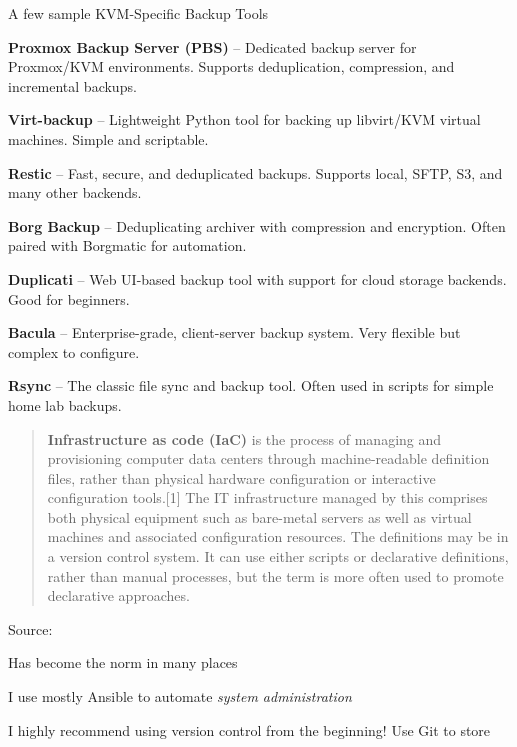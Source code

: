 \documentclass[Screen16to9,17pt]{foils}
\begin{document}
A few sample KVM-Specific Backup Tools
\begin{list2}
  \item {\bf Proxmox Backup Server (PBS)} -- Dedicated backup server for Proxmox/KVM environments. Supports deduplication, compression, and incremental backups.
  \item {\bf Virt-backup} -- Lightweight Python tool for backing up libvirt/KVM virtual machines. Simple and scriptable.
  \item {\bf Restic} -- Fast, secure, and deduplicated backups. Supports local, SFTP, S3, and many other backends.
  \item {\bf Borg Backup} -- Deduplicating archiver with compression and encryption. Often paired with Borgmatic for automation.
  \item {\bf Duplicati} -- Web UI-based backup tool with support for cloud storage backends. Good for beginners.
  \item {\bf Bacula} -- Enterprise-grade, client-server backup system. Very flexible but complex to configure.
  \item {\bf Rsync} -- The classic file sync and backup tool. Often used in scripts for simple home lab backups.
\end{list2}




\begin{quote}
{\bf Infrastructure as code (IaC)} is the process of managing and provisioning computer data centers through machine-readable definition files, rather than physical hardware configuration or interactive configuration tools.[1] The IT infrastructure managed by this comprises both physical equipment such as bare-metal servers as well as virtual machines and associated configuration resources. The definitions may be in a version control system. It can use either scripts or declarative definitions, rather than manual processes, but the term is more often used to promote declarative approaches.
\end{quote}
Source: {\footnotesize
{}}

\begin{list2}
\item Has become the norm in many places
\item I use mostly Ansible to automate \emph{system administration}
\item I highly recommend using version control from the beginning! Use Git to store
\end{list2}
\end{document}
